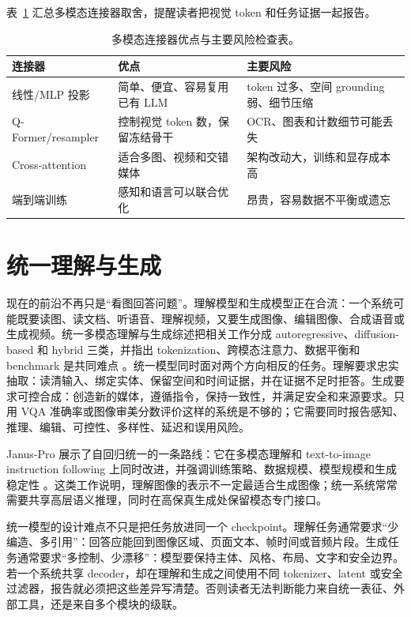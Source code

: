 \documentclass[UTF8,zihao=-4,openany]{ctexbook}
\begin{document}
表~\ref{tab:zh-vlm-connector-risks} 汇总多模态连接器取舍，提醒读者把视觉 token 和任务证据一起报告。

\begin{table}[t]
\centering
\begin{tabular}{p{}p{}p{}}
\toprule
连接器 & 优点 & 主要风险 \\
\midrule
线性/MLP 投影 & 简单、便宜、容易复用已有 LLM & token 过多、空间 grounding 弱、细节压缩 \\
Q-Former/resampler & 控制视觉 token 数，保留冻结骨干 & OCR、图表和计数细节可能丢失 \\
Cross-attention & 适合多图、视频和交错媒体 & 架构改动大，训练和显存成本高 \\
端到端训练 & 感知和语言可以联合优化 & 昂贵，容易数据不平衡或遗忘 \\
\bottomrule
\end{tabular}
\caption{多模态连接器优点与主要风险检查表。}
\label{tab:zh-vlm-connector-risks}
\end{table}

\section{统一理解与生成}
现在的前沿不再只是“看图回答问题”。理解模型和生成模型正在合流：一个系统可能既要读图、读文档、听语音、理解视频，又要生成图像、编辑图像、合成语音或生成视频。统一多模态理解与生成综述把相关工作分成 autoregressive、diffusion-based 和 hybrid 三类，并指出 tokenization、跨模态注意力、数据平衡和 benchmark 是共同难点 \cite{zhao2025unifiedmmug}。统一模型同时面对两个方向相反的任务。理解要求忠实抽取：读清输入、绑定实体、保留空间和时间证据，并在证据不足时拒答。生成要求可控合成：创造新的媒体，遵循指令，保持一致性，并满足安全和来源要求。只用 VQA 准确率或图像审美分数评价这样的系统是不够的；它需要同时报告感知、推理、编辑、可控性、多样性、延迟和误用风险。

Janus-Pro 展示了自回归统一的一条路线：它在多模态理解和 text-to-image instruction following 上同时改进，并强调训练策略、数据规模、模型规模和生成稳定性 \cite{chen2025januspro}。这类工作说明，理解图像的表示不一定最适合生成图像；统一系统常常需要共享高层语义推理，同时在高保真生成处保留模态专门接口。

统一模型的设计难点不只是把任务放进同一个 checkpoint。理解任务通常要求“少编造、多引用”：回答应能回到图像区域、页面文本、帧时间或音频片段。生成任务通常要求“多控制、少漂移”：模型要保持主体、风格、布局、文字和安全边界。若一个系统共享 decoder，却在理解和生成之间使用不同 tokenizer、latent 或安全过滤器，报告就必须把这些差异写清楚。否则读者无法判断能力来自统一表征、外部工具，还是来自多个模块的级联。
\end{document}
